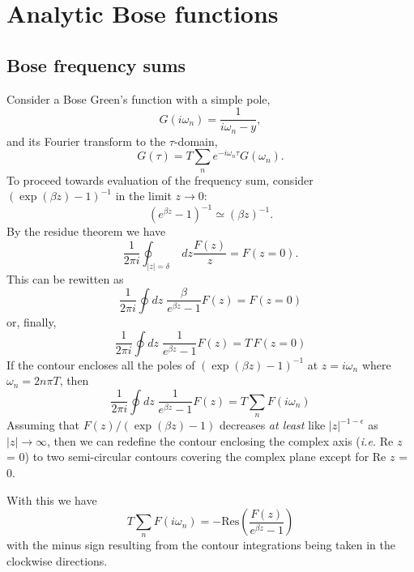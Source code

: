 \chapter{Analytic Bose functions}
\label{chapter:bose-functions}

\section{Bose frequency sums}
Consider a Bose Green's function with a simple pole,
\begin{equation}
G(i \omega_n) =  \frac{1}{i \omega_n - y},
\end{equation}
and its Fourier transform to the $\tau$-domain,
\begin{equation}
G(\tau)  =  T \sum_n e^{-i\omega_n \tau} G(\omega_n).
\end{equation}
To proceed towards evaluation of the frequency sum, consider
$(\exp(\beta z) - 1)^{-1}$ in the limit
$z \to 0$:
\begin{equation}
(e^{\beta z} - 1)^{-1} \simeq (\beta z)^{-1}.
\end{equation}
By the residue theorem we have
\begin{equation}
\frac{1}{2 \pi i} \oint_{|z|=\delta}\; dz \frac{F(z)}{z} 
 = F(z = 0).
\end{equation}
This can be rewitten as
\begin{equation}
\frac{1}{2 \pi i} \oint dz \; \frac{\beta}{e^{\beta z}-1} 
F(z) = F(z = 0)
\end{equation}
or, finally, 
\begin{equation}
\frac{1}{2 \pi i} \oint dz \; \frac{1}{e^{\beta z}-1} 
F(z) = T \, F(z = 0)
\end{equation}
If the contour encloses all the poles of
$(\exp(\beta z)-1)^{-1}$ at $z = i\omega_n$
where $\omega_n = 2 n \pi T$, then
\begin{equation}
\frac{1}{2 \pi i} \oint dz \; \frac{1}{e^{\beta z}-1} 
F(z) = T \sum_n F(i\omega_n)
\end{equation}
Assuming that $F(z) / (\exp(\beta z) - 1)$
decreases \textit{at least} like $|z|^{-1 - \epsilon}$
as $|z| \to \infty$, then we can redefine the
contour enclosing the  complex axis (\textit{i.e.} Re $z$ = 0)
to two semi-circular contours covering the complex plane
except for Re $z$ = 0.

With this we have
\begin{equation}
T \sum_n F(i\omega_n) = -\mathrm{Res}
\left( \frac{F(z)}{e^{\beta z}-1}\right)
\end{equation}
with the minus sign resulting from the contour integrations being
taken in the clockwise directions.

